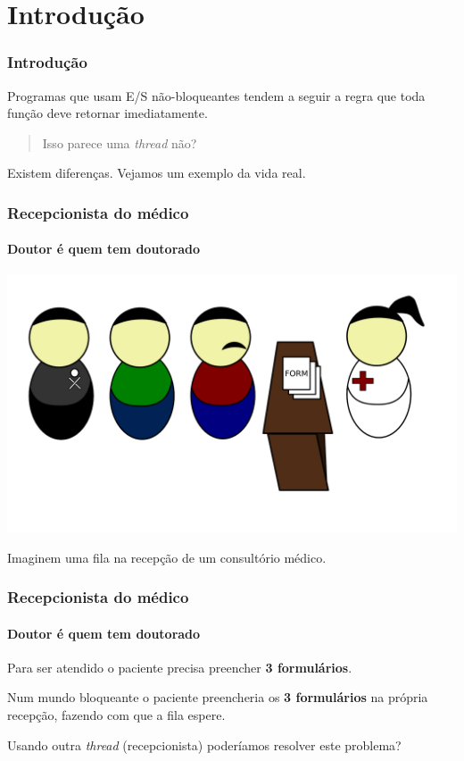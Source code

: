 \section{Introdução}

\begin{frame}\frametitle{Introdução}

Programas que usam E/S não-bloqueantes tendem a seguir a regra que toda
função deve retornar imediatamente.

\begin{quote}
Isso parece uma \emph{thread} não?

\end{quote}
Existem diferenças. Vejamos um exemplo da vida real.

\end{frame}

\begin{frame}\frametitle{Recepcionista do médico}

\framesubtitle{Doutor é quem tem doutorado}

\includegraphics[scale=0.35]{img/ex1-1.png}

Imaginem uma fila na recepção de um consultório médico.

\end{frame}

\begin{frame}\frametitle{Recepcionista do médico}

\framesubtitle{Doutor é quem tem doutorado}

Para ser atendido o paciente precisa preencher \textbf{3 formulários}.

Num mundo bloqueante o paciente preencheria os \textbf{3 formulários} na
própria recepção, fazendo com que a fila espere.

Usando outra \emph{thread} (recepcionista) poderíamos resolver este
problema?

\end{frame}


